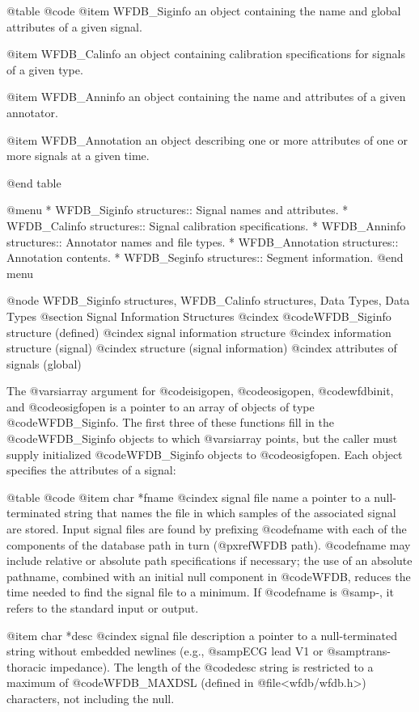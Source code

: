 {{{{{{{{{@table @code
@item WFDB_Siginfo
an object containing the name and global attributes of a given signal.

@item WFDB_Calinfo
an object containing calibration specifications for signals of a given
type.

@item WFDB_Anninfo
an object containing the name and attributes of a given annotator.

@item WFDB_Annotation
an object describing one or more attributes of one or more signals at a
given time.

@end table

@menu
* WFDB_Siginfo structures::		Signal names and attributes.
* WFDB_Calinfo structures::		Signal calibration specifications.
* WFDB_Anninfo structures::		Annotator names and file types.
* WFDB_Annotation structures::		Annotation contents.
* WFDB_Seginfo structures::              Segment information.
@end menu

@node WFDB_Siginfo structures, WFDB_Calinfo structures, Data Types, Data Types
@section Signal Information Structures
@cindex @code{WFDB_Siginfo} structure (defined)
@cindex signal information structure
@cindex information structure (signal)
@cindex structure (signal information)
@cindex attributes of signals (global)

The @var{siarray} argument for @code{isigopen}, @code{osigopen},
@code{wfdbinit}, and @code{osigfopen} is a pointer to an array of
objects of type @code{WFDB_Siginfo}.  The first three of these functions
fill in the @code{WFDB_Siginfo} objects to which @var{siarray} points, but
the caller must supply initialized @code{WFDB_Siginfo} objects to
@code{osigfopen}.  Each object specifies the attributes of a
signal:

@table @code
@item char *fname
@cindex signal file name
a pointer to a null-terminated string that names the file in which
samples of the associated signal are stored.  Input signal files are
found by prefixing @code{fname} with each of the components of the
database path in turn (@pxref{WFDB path}).  @code{fname} may include
relative or absolute path specifications if necessary; the use of an
absolute pathname, combined with an initial null component in @code{WFDB},
reduces the time needed to find the signal file to a minimum.  If
@code{fname} is @samp{-}, it refers to the standard input or
output.

@item char *desc
@cindex signal file description
a pointer to a null-terminated string without embedded newlines (e.g.,
@samp{ECG lead V1} or @samp{trans-thoracic impedance}).  The length of
the @code{desc} string is restricted to a maximum of @code{WFDB_MAXDSL}
(defined in @file{<wfdb/wfdb.h>}) characters, not including the null.

}}}}}}}}}
